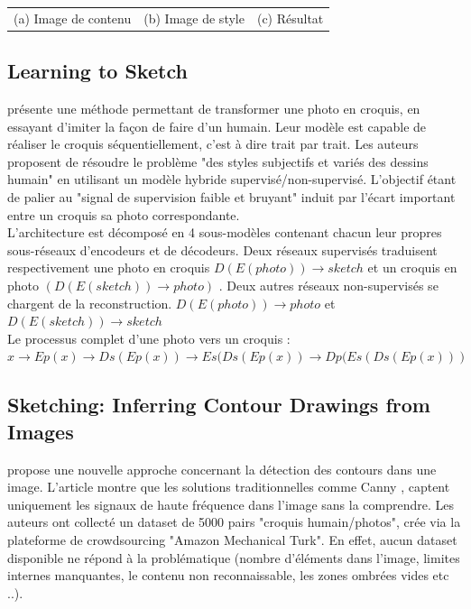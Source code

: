 \documentclass[a4paper, 12pt]{book}
\begin{document}
\begin{center}
\begin{tabular}{ccc}
    (a) Image de contenu & (b) Image de style &(c) Résultat
  \end{tabular}
\end{center}


\subsection{Learning to Sketch} 
\cite{DBLP:journals/corr/abs-1805-00247} présente une méthode permettant de transformer une photo en croquis, en essayant d'imiter la façon de faire d'un humain. Leur modèle est capable de réaliser le croquis séquentiellement, c'est à dire trait par trait. Les auteurs proposent de résoudre le problème "des styles subjectifs et variés des dessins humain" en utilisant un modèle hybride supervisé/non-supervisé. L'objectif étant de palier au "signal de supervision faible et bruyant" induit par l'écart important entre un croquis sa photo correspondante. \\

L'architecture est décomposé en 4 sous-modèles contenant chacun leur propres sous-réseaux d'encodeurs et de décodeurs. Deux réseaux supervisés traduisent respectivement une photo en croquis $D(E(photo))\to sketch$ et un croquis en photo $(D(E(sketch))\to photo)$ . Deux autres réseaux non-supervisés se chargent de la reconstruction. $D(E(photo))\to photo$ et $D(E(sketch))\to sketch$  \\

Le processus complet d'une photo vers un croquis : \\ $x\to Ep(x)\to Ds(Ep(x))\to Es(Ds(Ep(x))\to Dp(Es(Ds(Ep(x)))$

\subsection{Sketching: Inferring Contour Drawings from Images}
\cite{DBLP:journals/corr/abs-1901-00542} propose une nouvelle approche concernant la détection des contours dans une image. L'article montre que les solutions traditionnelles comme Canny \cite{4767851} , captent uniquement les signaux de haute fréquence dans l’image sans la comprendre. Les auteurs ont collecté un dataset de 5000 pairs "croquis humain/photos", crée via la plateforme de crowdsourcing "Amazon Mechanical Turk". En effet, aucun dataset disponible ne répond à la problématique (nombre d'éléments dans l'image, limites internes manquantes, le contenu non reconnaissable, les zones ombrées vides etc ..).
\end{document}
